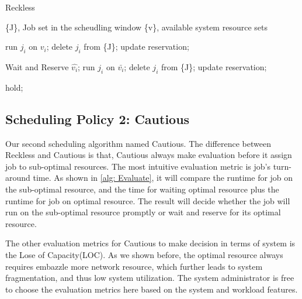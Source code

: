 \documentclass[conference]{IEEEtran}
\begin{document}
\begin{algorithm}
  \label{alg:scheudling1}
  \caption{Reckless}
  \begin{algorithmic}
    \State \{J\}, Job set in the scheudling window
    \State \{v\}, available system resource sets
        
            \State run $j_i$ on $v_i$;
            \State delete $j_i$ from \{J\};
            \State update reservation;
        \EndIf
        
                \State Wait and Reserve $\hat{v_i}$;
            \EndIf
                \State run $j_i$ on $\bar{v_i}$;
                \State delete $j_i$ from \{J\};
                \State update reservation;
            \EndIf
        \EndIf
        
            \State hold;
        \EndIf
        
    \EndWhile
  \end{algorithmic}
\end{algorithm}


\subsection{Scheduling Policy 2: Cautious}
\label{sec:cautious}

Our second scheduling algorithm named Cautious. The difference between Reckless and Cautious is that, Cautious always make evaluation before it assign job to sub-optimal resources. The most intuitive evaluation metric is job's turn-around time. As shown in \ref{alg: Evaluate}, it will compare the runtime for job on the sub-optimal resource, and the time for waiting optimal resource plus the runtime for job on optimal resource. The result will decide whether the job will run on the sub-optimal resource promptly or wait and reserve for its optimal resource.

The other evaluation metrics for Cautious to make decision in terms of system is the Lose of Capacity(LOC). As we shown before, the optimal resource always requires embazzle more network resource, which further leads to system fragmentation, and thus low system utilization. The system administrator is free to choose the evaluation metrics here based on the system and workload features.
\end{document}
